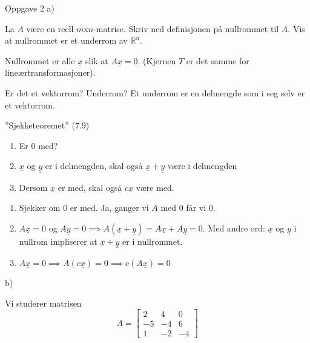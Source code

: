\documentclass[11pt, a4paper, norsk]{article}
\begin{document}
            \begin{Example}{Oppgave 2}{}
                a)

                
                La $A$ være en reell $m$x$n$-matrise. Skriv ned definisjonen på nullrommet til $A$. Vis at nullrommet er et underrom av $\mathbb{R}^{n}$.

                Nullrommet er alle $\underline{x}$ slik at $A\underline{x} = \underline{0}$. (Kjernen $T$ er det samme for lineærtransformasjoner). 

            Er det et vektorrom? Underrom? Et underrom er en delmengde som i seg selv er et vektorrom. 

            \begin{Theorem}{''Sjekketeoremet'' (7.9)}{}
                \begin{enumerate}
                    \item Er 0 med?
                    \item $\underline{x}$ og $\underline{y}$ er i delmengden, skal også $\underline{x} + \underline{y}$ være i delmengden
                    \item Dersom $\underline{x}$ er med, skal også $c\underline{x}$ være med.
                \end{enumerate}
            \end{Theorem}
                \begin{enumerate}
                    \item Sjekker om 0 er med. Ja, ganger vi $A$ med $0$ får vi $0$.
                    \item $A\underline{x} = 0$ og $A\underline{y} = 0 \implies A(\underline{x} + \underline{y}) = A\underline{x} + A\underline{y} = 0$. Med andre ord: $\underline{x}$ og $\underline{y}$ i nullrom impliserer at $\underline{x} + \underline{y}$ er i nullrommet.
                    \item $A\underline{x} = 0 \implies A(c\underline{x}) = 0 \implies c(A\underline{x}) = 0$
                \end{enumerate}

                 b)
                 
                Vi studerer matrisen \[ A = \begin{bmatrix}
                    2 & 4 & 0 \\
                    -5 & -4 & 6 \\
                    1 & -2 & -4
                \end{bmatrix} \]


\end{Example}
\end{document}

